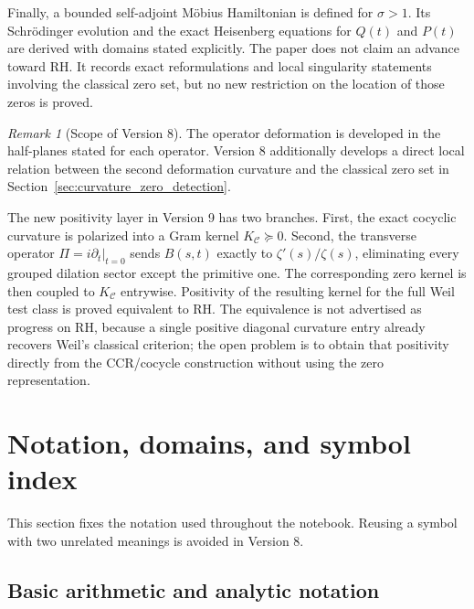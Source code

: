 \documentclass[11pt]{amsart}
\numberwithin{equation}{section}
\theoremstyle{plain}
\theoremstyle{definition}
\theoremstyle{remark}
\newtheorem{remark}[theorem]{Remark}
\begin{document}
Finally, a bounded self-adjoint M\"obius Hamiltonian is defined for
\(\sigma>1\).  Its Schr\"odinger evolution and the exact Heisenberg equations
for \(Q(t)\) and \(P(t)\) are derived with domains stated explicitly.  The
paper does not claim an advance toward RH.  It records exact reformulations and
local singularity statements involving the classical zero set, but no new
restriction on the location of those zeros is proved.

\begin{remark}[Scope of Version 8]
\label{rem:v3_scope}
The operator deformation is developed in the half-planes stated for each
operator. Version 8 additionally develops a direct local relation between the
second deformation curvature and the classical zero set in
Section~\ref{sec:curvature_zero_detection}.
\end{remark}



The new positivity layer in Version 9 has two branches.  First, the exact
cocyclic curvature is polarized into a Gram kernel
\(K_{\mathcal C}\succeq0\).  Second, the transverse operator
\(\Pi=i\partial_t|_{t=0}\) sends \(B(s,t)\) exactly to
\(\zeta'(s)/\zeta(s)\), eliminating every grouped dilation sector except the
primitive one.  The corresponding zero kernel is then coupled to
\(K_{\mathcal C}\) entrywise.  Positivity of the resulting kernel for the
full Weil test class is proved equivalent to RH.  The equivalence is not
advertised as progress on RH, because a single positive diagonal curvature
entry already recovers Weil's classical criterion; the open problem is to
obtain that positivity directly from the CCR/cocycle construction without
using the zero representation.

\section{Notation, domains, and symbol index}
\label{sec:notation}

This section fixes the notation used throughout the notebook.  Reusing a
symbol with two unrelated meanings is avoided in Version 8.

\subsection{Basic arithmetic and analytic notation}
\label{subsec:notation_arithmetic}
\end{document}
